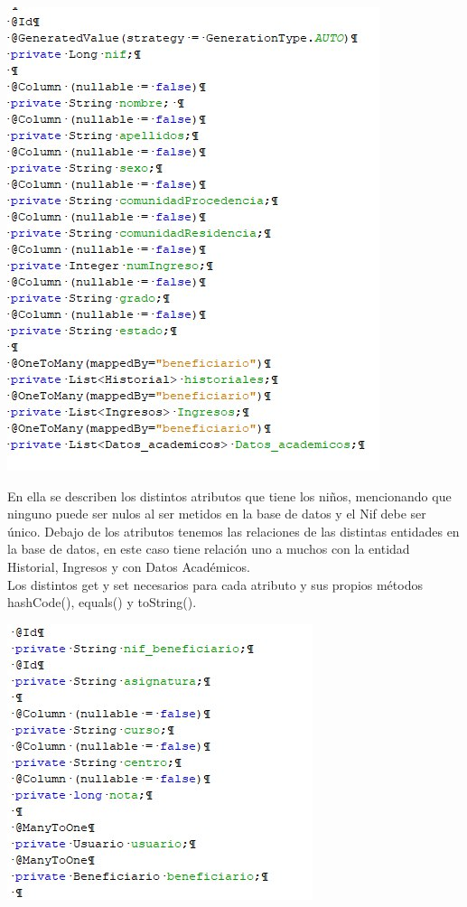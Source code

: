 \documentclass{article}
\begin{document}
\begin{center}
\includegraphics[scale=0.5]{images/beneficiario.jpg}
\end{center}

En ella se describen los distintos atributos que tiene los niños, mencionando que ninguno puede ser nulos al ser metidos en la base de datos y el Nif debe ser único.
Debajo de los atributos tenemos las relaciones de las distintas entidades en la base de datos, en este caso tiene relación uno a muchos con la entidad Historial, Ingresos y con Datos Académicos.\\
Los distintos get y set necesarios para cada atributo y sus propios métodos hashCode(),
equals() y toString().

\begin{center}
\includegraphics[scale=0.5]{images/relaciones.jpg}
\end{center}
\end{document}
